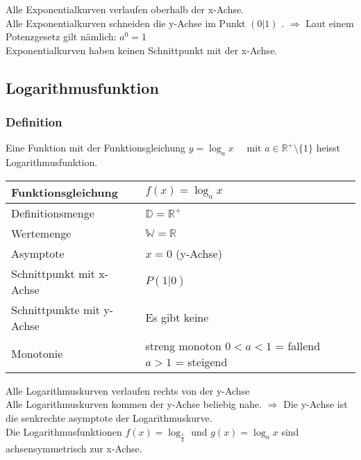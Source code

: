 \begin{multicols}{2}
    Alle Exponentialkurven verlaufen oberhalb der x-Achse. \\
    Alle Exponentialkurven schneiden die y-Achse im Punkt $(0|1)$ . $\Longrightarrow$ Laut einem Potenzgesetz gilt nämlich: $a^0 = 1$ \\
    Exponentialkurven haben keinen Schnittpunkt mit der x-Achse.
    \subsection{Logarithmusfunktion}
    \vspace{-4mm}
    \subsubsection{Definition}
    \vspace{-4mm}
    Eine Funktion mit der Funktionsgleichung $y = \log_{a}x \quad \text{ mit } a \in \mathbb{R}^{+}\setminus\{1\}$ heisst Logarithmusfunktion.
    \begin{tabularx}{0.5\textwidth} {
            | >{\raggedright\arraybackslash}X
            | >{\raggedright\arraybackslash}X |}
        \hline
        Funktionsgleichung        & $f(x) = \log_{a}x$                                       \\ \hline
        Definitionsmenge          & $\mathbb{D} = \mathbb{R}^{+}$                            \\ \hline
        Wertemenge                & $\mathbb{W} = \mathbb{R}$                                \\ \hline
        Asymptote                 & $x = 0$ (y-Achse)                                        \\ \hline
        Schnittpunkt mit x-Achse  & $P(1|0)$                                                 \\ \hline
        Schnittpunkte mit y-Achse & Es gibt keine                                            \\ \hline
        Monotonie                 & streng monoton $0 < a < 1$  = fallend $a > 1$ = steigend \\ \hline
    \end{tabularx}

    Alle Logarithmuskurven verlaufen rechts von der y-Achse \\
    Alle Logarithmuskurven kommen der y-Achse beliebig nahe. $\Rightarrow$ Die y-Achse ist die senkrechte asymptote der Logarithmuskurve. \\
    Die Logarithmusfunktionen $f(x) = \log_{\frac{1}{a}}$ und $g(x) = \log_{a}x$ sind achsensymmetrisch zur x-Achse.


\end{multicols}
